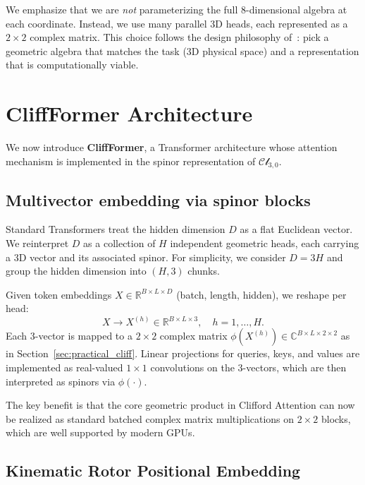 \documentclass{article}
\theoremstyle{plain}
\theoremstyle{definition}
\theoremstyle{remark}
\newcommand{\cliff}{\mathcal{Cl}}
\newcommand{\R}{\mathbb{R}}
\newcommand{\C}{\mathbb{C}}
\begin{document}
We emphasize that we are \emph{not} parameterizing the full $8$-dimensional algebra at each coordinate. Instead, we use many parallel 3D heads, each represented as a $2\times2$ complex matrix. This choice follows the design philosophy of~\citet{dehaan2024choosing}: pick a geometric algebra that matches the task (3D physical space) and a representation that is computationally viable.

\section{CliffFormer Architecture}
\label{sec:method}

We now introduce \textbf{CliffFormer}, a Transformer architecture whose attention mechanism is implemented in the spinor representation of $\cliff_{3,0}$.

\subsection{Multivector embedding via spinor blocks}
\label{sec:isomorphism_details}

Standard Transformers treat the hidden dimension $D$ as a flat Euclidean vector. We reinterpret $D$ as a collection of $H$ independent geometric heads, each carrying a 3D vector and its associated spinor. For simplicity, we consider $D = 3H$ and group the hidden dimension into $(H,3)$ chunks.

Given token embeddings $X \in \R^{B \times L \times D}$ (batch, length, hidden), we reshape per head:
\begin{equation}
    X \rightarrow X^{(h)} \in \R^{B \times L \times 3}, \quad h=1,\dots,H.
\end{equation}
Each $3$-vector is mapped to a $2\times2$ complex matrix $\phi(X^{(h)}) \in \C^{B \times L \times 2 \times 2}$ as in Section~\ref{sec:practical_cliff}. Linear projections for queries, keys, and values are implemented as real-valued $1\times1$ convolutions on the $3$-vectors, which are then interpreted as spinors via $\phi(\cdot)$.

The key benefit is that the core geometric product in Clifford Attention can now be realized as standard batched complex matrix multiplications on $2 \times 2$ blocks, which are well supported by modern GPUs.

\subsection{Kinematic Rotor Positional Embedding}
\label{sec:kinematic_pe}
\end{document}
